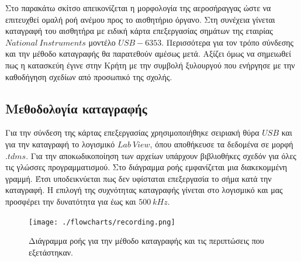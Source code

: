 \documentclass[breaklines=true, 12pt]{article}
\begin{document}
{{{Στο παρακάτω σκίτσο απεικονίζεται η μορφολογία της αεροσήραγγας ώστε να
επιτευχθεί ομαλή ροή ανέμου προς το αισθητήριο όργανο. Στη συνέχεια γίνεται
καταγραφή του αισθητήρα με ειδική κάρτα επεξεργασίας σημάτων της εταιρίας
\(National\ Instruments\) μοντέλο \(USB-6353\). Περισσότερα για τον τρόπο σύνδεσης και
την μέθοδο καταγραφής θα παρατεθούν αμέσως μετά. Αξίζει όμως να σημειωθεί
πως η κατασκεύη έγινε στην Κρήτη με την συμβολή ξυλουργού που ενήργησε με την
καθοδήγηση σχεδίων από προσωπικό της σχολής.
\subsection{Μεθοδολογία καταγραφής}
\label{sec:org8f709ac}
Για την σύνδεση της κάρτας επεξεργασίας χρησιμοποιήθηκε σειριακή θύρα \(USB\) και
για την καταγραφή το λογισμικό \(Lab\ View\), όπου αποθήκευσε τα δεδομένα σε μορφή
\(.tdms\). Για την αποκωδικοποίηση των αρχείων υπάρχουν βιβλιοθήκες σχεδόν για όλες
τις γλώσσες προγραμματισμού. Στο διάγραμμα ροής εμφανίζεται μια διακεκομμένη
γραμμή. Έτσι υποδεικνύεται πως δεν υφίσταται επεξεργασία το σήμα κατά την
καταγραφή. Η επιλογή της συχνότητας καταγραφής γίνεται στο λογισμικό και μας
προσφέρει την δυνατότητα για έως και \(500\ kHz\).
\begin{figure}[htbp]
\centering
\texttt{[image: ./flowcharts/recording.png]}
\caption{Διάγραμμα ροής για την μέθοδο καταγραφής και τις περιπτώσεις που εξετάστηκαν.}
\end{figure}
}}}
\end{document}
